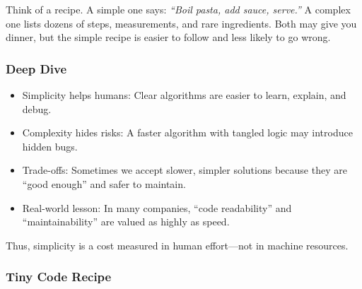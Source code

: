 \documentclass[
  letterpaper,
  DIV=11,
  numbers=noendperiod]{scrreprt}
\providecommand{\tightlist}{%
  \setlength{\itemsep}{0pt}\setlength{\parskip}{0pt}}
\begin{document}
Think of a recipe. A simple one says: \emph{``Boil pasta, add sauce,
serve.''} A complex one lists dozens of steps, measurements, and rare
ingredients. Both may give you dinner, but the simple recipe is easier
to follow and less likely to go wrong.

\subsubsection{Deep Dive}\label{deep-dive-44}

\begin{itemize}
\tightlist
\item
  Simplicity helps humans: Clear algorithms are easier to learn,
  explain, and debug.
\item
  Complexity hides risks: A faster algorithm with tangled logic may
  introduce hidden bugs.
\item
  Trade-offs: Sometimes we accept slower, simpler solutions because they
  are ``good enough'' and safer to maintain.
\item
  Real-world lesson: In many companies, ``code readability'' and
  ``maintainability'' are valued as highly as speed.
\end{itemize}

Thus, simplicity is a cost measured in human effort---not in machine
resources.

\subsubsection{Tiny Code Recipe}\label{tiny-code-recipe-72}
\end{document}
